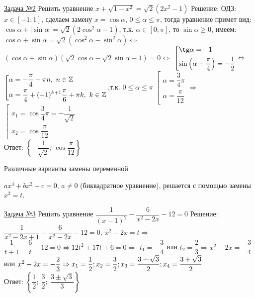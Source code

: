 \documentclass[a4paper,12pt]{article} %
\begin{document}
\label{Problem2}
\underline{Задача №2}
Решить уравнение $x+\sqrt{1-x^2} = \sqrt2(2x^2-1)$\newline
Решение: ОДЗ: $x\in [-1; 1]$, сделаем замену $x=\cos\alpha$, $0 \le \alpha \le \pi$, 
тогда уравнение примет вид: $\cos\alpha+|\sin\alpha| = \sqrt2(2\cos^2\alpha-1)$,
т.к. $\alpha\in [0;\pi]$, то $\sin\alpha \ge 0$, имеем: $\cos\alpha + \sin\alpha = \sqrt2(\cos^2\alpha - \sin^2\alpha) \Leftrightarrow$
$(\cos\alpha+\sin\alpha)(\sqrt2\cos\alpha-\sqrt2\sin\alpha-1) = 0 \Leftrightarrow$
$\left[\begin{gathered}
	\tg\alpha=-1 \hfill \\
	\sin\left(\alpha-\dfrac{\pi}{4}\right)=-\dfrac12
\end{gathered}\right.
\Leftrightarrow
$
$\left[\begin{gathered}
	\alpha=-\dfrac{\pi}{4}+\pi n,\ n\in\mathbb Z \hfill \\
	\alpha=\dfrac{\pi}{4}+(-1)^{k+1}\dfrac{\pi}{6} + \pi k,\ k\in\mathbb Z \hfill
\end{gathered}\right.
$,т.к. $0\le\alpha\le\pi
$
$\left[\begin{gathered}
	\alpha=\dfrac{3}{4}\pi \\
	\alpha=\dfrac{\pi}{12}
\end{gathered}\right.
\Rightarrow
$
$\left[\begin{gathered}
	x_1=\cos\dfrac{3}{4}\pi=-\dfrac{1}{\sqrt2} \\
	x_2=\cos\dfrac{\pi}{12}
\end{gathered}\right.
$\\
Ответ: $\left\{ -\dfrac{1}{\sqrt2};\ \cos\dfrac{\pi}{12} \right\}$

\begin{center}
{\large Различные варианты замены переменной}
\end{center}

$ax^4+bx^2+c=0$, $a \ne 0$ (биквадратное уравнение), решается с помощью замены $x^2=t$.

\label{Problem3}
\underline{Задача №3}
Решить уравнение $\dfrac{1}{(x-1)^2}-\dfrac{6}{x^2-2x}-12=0$\newline
Решение:$\dfrac{1}{x^2-2x+1} - \dfrac{6}{x^2-2x}-12=0,\ x^2-2x=t \Rightarrow$
$\dfrac{1}{t+1}-\dfrac{6}{t}-12 = 0 \Leftrightarrow 12t^2+17t+6=0 \Rightarrow$
$t_1=-\dfrac{3}{4}$ или $t_2=\dfrac{2}{3} \Rightarrow x^2-2x=-\dfrac{3}{4}$ или
$x^2-2x=-\dfrac{2}{3} \Rightarrow \\ x_1 = \dfrac12; x_2=\dfrac32; x_3=\dfrac{3-\sqrt3}2; x_4=\dfrac{3+\sqrt3}2$\\
Ответ: $\left\{ \dfrac12;\ \dfrac32;\ \dfrac{3\pm\sqrt3}{3} \right\}$
\end{document}

